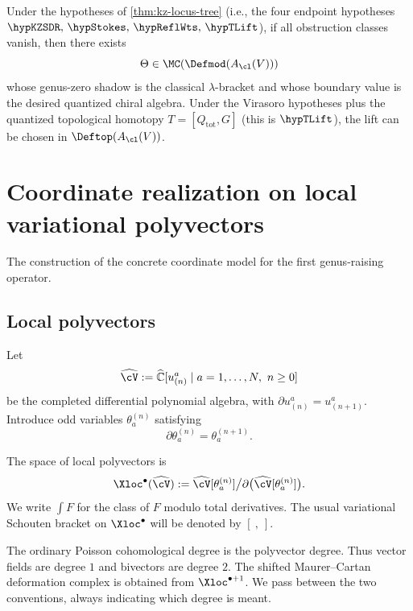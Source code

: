 \begin{corollary}
Under the hypotheses of \cref{thm:kz-locus-tree} (i.e., the four
endpoint hypotheses
$\hypKZSDR,\,\hypStokes,\,\hypReflWts,\,\hypTLift$), if all
obstruction classes vanish, then there exists
\[
\Theta\in \MC(\Defmod(A_{\cl}(V)))
\]
whose genus-zero shadow is the classical $\lambda$-bracket and whose boundary value is the
desired quantized chiral algebra. Under the Virasoro hypotheses plus
the quantized topological homotopy $T=[Q_{\mathrm{tot}},G]$ (this is
$\hypTLift$), the lift can be chosen in $\Deftop(A_{\cl}(V))$.
\end{corollary}

\section{Coordinate realization on local variational polyvectors}

The construction of the concrete coordinate model for the first genus-raising operator.

\subsection{Local polyvectors}

Let
\[
\widehat{\cV}:=
\widehat{\mathbb C}[u^a_{(n)}\mid a=1,\dots,N,\ n\ge 0]
\]
be the completed differential polynomial algebra, with $\partial u^a_{(n)}=u^a_{(n+1)}$.
Introduce odd variables $\theta_a^{(n)}$ satisfying
\[
\partial \theta_a^{(n)}=\theta_a^{(n+1)}.
\]

\begin{definition}
The space of local polyvectors is
\[
\Xloc^\bullet(\widehat{\cV})
:=
\widehat{\cV}[\theta_a^{(n)}]\big/\partial\big(\widehat{\cV}[\theta_a^{(n)}]\big).
\]
We write $\int F$ for the class of $F$ modulo total derivatives. The usual variational
Schouten bracket on $\Xloc^\bullet$ will be denoted by $[\ ,\ ]$.
\end{definition}

\begin{remark}
The ordinary Poisson cohomological degree is the polyvector degree. Thus vector fields are
degree $1$ and bivectors are degree $2$. The shifted Maurer--Cartan deformation complex is
obtained from $\Xloc^{\bullet+1}$. We pass between the two conventions,
always indicating which degree is meant.
\end{remark}

